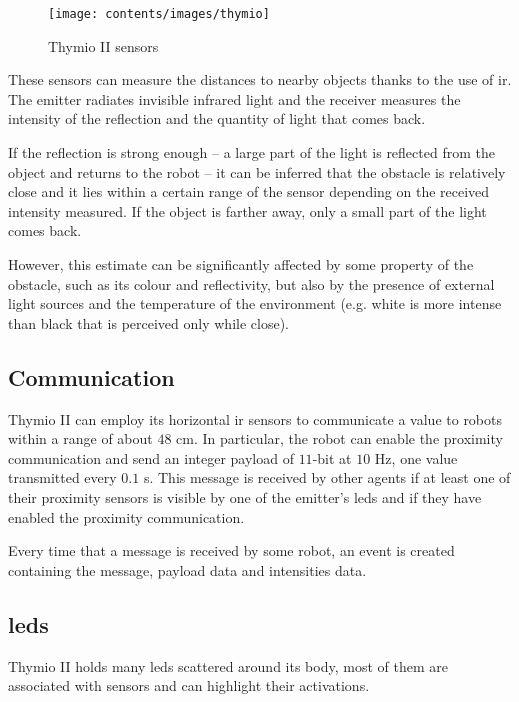 \begin{figure}[h!tb]
	\centering
	\texttt{[image: contents/images/thymio]}
	\caption{Thymio II sensors}
	\label{fig:thymio sensors}
\end{figure}

These sensors can measure the distances to nearby objects thanks to the use 
of  \gls{ir}. The emitter radiates invisible infrared light and the receiver 
measures the intensity of the reflection and the quantity of light that comes 
back.

If the reflection is strong enough – a large part of the light is reflected from 
the object and returns to the robot – it can be inferred that the obstacle is 
relatively close and it lies within a certain range of the sensor depending on 
the received intensity measured. If the object is farther away, only a small 
part of the light comes back.

However, this estimate can be significantly affected by some property of the 
obstacle, such as its colour and reflectivity, but also by the presence of 
external light sources and the temperature of the environment (e.g. white is 
more intense than black that is perceived only while close).

\subsection{Communication}
\label{subsec:thymiocomm}

Thymio II can employ its horizontal \gls{ir} sensors to communicate a value 
to robots within a range of about $48$ \gls{cm}. 
In particular, the robot can enable the proximity communication and send an 
integer payload of $11$-bit at $10$ \gls{Hz}, one value transmitted every $0.1$ 
\gls{s}. 
This message is received by other agents if at least one of their proximity sensors 
is visible by one of the emitter’s \glspl{led} and if they have enabled the proximity 
communication.

Every time that a message is received by some robot, an event is 
created containing the message, payload data and intensities data.

\subsection{\glspl{led}}
\label{subsec:thymioled}

Thymio II holds many \glspl{led} scattered around its body, most of them are 
associated 
with sensors and can highlight their activations.

